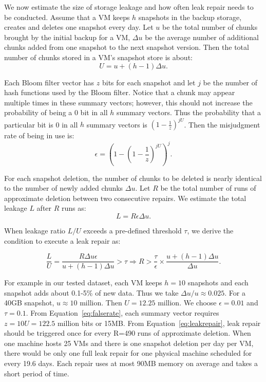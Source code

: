 We now estimate the size of storage leakage and how often leak repair needs to be conducted.
Assume that  a VM keeps $h$ snapshots in the backup storage, creates and deletes one snapshot
every day. Let $u$ be the total number of chunks brought by the initial backup for a VM, $\Delta u$ be the average
number of additional chunks added from one snapshot to the next snapshot version. Then the total number of 
chunks stored in a VM's snapshot store is about:
\[
U = u + (h-1)\Delta u.
\]

Each Bloom filter vector has  $z$ bits for each snapshot and let $j$ be the number of hash functions used by the
Bloom filter.  Notice that a chunk may appear multiple times in these summary vectors; however, this should not 
increase the probability of being a 0 bit in all $h$ summary vectors.
Thus the probability that a particular bit is 0  in all $h$ summary vectors is  
$(1- \frac{1}{z}) ^{j U}$. 
Then the misjudgment rate of being in use  is: 
\begin{equation}
\label{eq:falserate}
\epsilon = (1-(1-\frac{1}{z})^{jU})^j.
\end{equation}

For each snapshot deletion, the number of chunks to be deleted is nearly identical to the number of
newly added chunks $\Delta u$. 
Let $R$ be the total number of runs of approximate deletion between two consecutive 
repairs. We estimate  the total leakage $L$ after $R$ runs as:
\[
L = R \epsilon \Delta u.
\]

When leakage ratio $L/U$ exceeds a pre-defined threshold $\tau$, we derive the condition to execute a leak repair as:

\begin{equation}
\label{eq:leakrepair}
\frac{L}{U} = \frac{R \Delta u \epsilon}{u+(h-1)\Delta u } > \tau 
\Longrightarrow R > \frac{\tau}{\epsilon}\times\frac{u + (h-1)\Delta u}{\Delta u}.
\end{equation}

For example in our tested dataset,  
each VM keeps $h=10$ snapshots and each snapshot adds
about 0.1-5\% of new data. Thus we take ${\Delta u}/{u} \approx 0.025$. For a 40GB snapshot, $u\approx  10$ million.
Then $U=12.25$ million.
We choose  $\epsilon = 0.01$ and $\tau=0.1$.  From Equation~\ref{eq:falserate}, 
each summary vector requires $z=10U=122.5$ million bits or 15MB. From Equation~\ref{eq:leakrepair}, 
leak repair should be triggered once for every R=490 runs of approximate deletion. 
When one machine hosts 25 VMs and there is one snapshot deletion per day per VM, there would be 
only one full leak repair for one physical machine scheduled for every 19.6 days. 
Each repair uses at most  90MB memory on average
and takes a short period of time.

